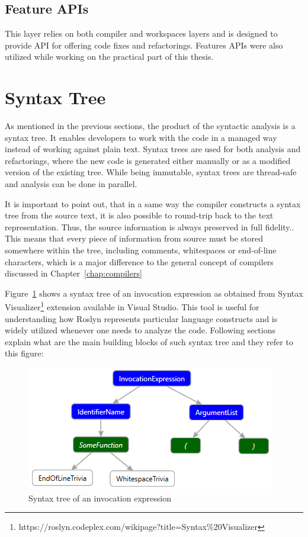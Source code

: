 \documentclass[
  digital, %
  table,   %
  lof,     %
  lot,     %
  oneside,
]{fithesis3}
\begin{document}
\subsection{Feature APIs}
This layer relies on both compiler and workspaces layers and is designed to provide API for offering code fixes and refactorings. Features APIs were also utilized while working on the practical part of this thesis.
  
\section{Syntax Tree}
As mentioned in the previous sections, the product of the syntactic analysis is a syntax tree. It enables developers to work with the code in a managed way instead of working against plain text. Syntax trees are used for both analysis and refactorings, where the new code is generated either manually or as a modified version of the existing tree. While being immutable, syntax trees are thread-safe and analysis can be done in parallel.

It is important to point out, that in a same way the compiler constructs a syntax tree from the source text, it is also possible to round-trip back to the text representation. Thus, the source information is always preserved in full fidelity.. This means that every piece of information from source must be stored somewhere within the tree, including comments, whitespaces or end-of-line characters, which is a major difference to the general concept of compilers discussed in Chapter~\ref{chap:compilers}

Figure~\ref{fig:roslyn-syntax-tree} shows a syntax tree of an invocation expression as obtained from Syntax Visualizer\footnote{https://roslyn.codeplex.com/wikipage?title=Syntax\%20Visualizer} extension available in Visual Studio. This tool is useful for understanding how Roslyn represents particular language constructs and is widely utilized whenever one needs to analyze the code. Following sections explain what are the main building blocks of such syntax tree and they refer to this figure:

\begin{figure}[h!]
		\centering
			\includegraphics[scale=0.8]{img/roslyn-syntax-tree-2}
		\caption{Syntax tree of an invocation expression}
		\label{fig:roslyn-syntax-tree}
\end{figure}
\end{document}
